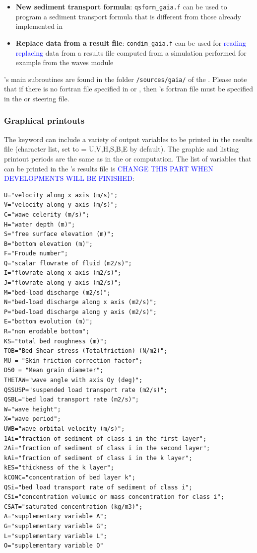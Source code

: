 {\begin{itemize}
\item \textbf{New sediment transport formula}: \texttt{qsform\_gaia.f} can be used to program a sediment transport formula that is different from those already implemented in \gaia{}

\item \textbf{Replace data from a result file}: \texttt{condim\_gaia.f} can be used for \textcolor{blue}{\sout{reading}} \textcolor{blue}{replacing} data from a results file computed from a simulation performed for example from the waves module \tomawac{}

\end{itemize}

\gaia{}'s main subroutines are found in the folder \texttt{/sources/gaia/} of the \telemacsystem{}. Please note that if there is no fortran file specified in  or , then \gaia's fortran file must be specified in the  or  steering file.

\pagebreak

\subsubsection{Graphical printouts}
The keyword  can include a variety of output variables to be printed in the results file (character list, set to {\ttfamily = U,V,H,S,B,E} by default). The graphic and listing printout periods are the same as in the  or  computation. The list of variables that can be printed in the \gaia{}'s results file is \textcolor{blue}{CHANGE THIS PART WHEN DEVELOPMENTS WILL BE FINISHED}:
\begin{lstlisting}[frame=trBL]
U="velocity along x axis (m/s)";
V="velocity along y axis (m/s)";
C="wawe celerity (m/s)";
H="water depth (m)";
S="free surface elevation (m)";
B="bottom elevation (m)";
F="Froude number";
Q="scalar flowrate of fluid (m2/s)";
I="flowrate along x axis (m2/s)";
J="flowrate along y axis (m2/s)";
M="bed-load discharge (m2/s)";
N="bed-load discharge along x axis (m2/s)";
P="bed-load discharge along y axis (m2/s)";
E="bottom evolution (m)";
R="non erodable bottom";
KS="total bed roughness (m)";
TOB="Bed Shear stress (Totalfriction) (N/m2)";
MU = "Skin friction correction factor";
D50 = "Mean grain diameter";
THETAW="wave angle with axis Oy (deg)";
QSSUSP="suspended load transport rate (m2/s)";
QSBL="bed load transport rate (m2/s)";
W="wave height";
X="wave period";
UWB="wave orbital velocity (m/s)";
1Ai="fraction of sediment of class i in the first layer";
2Ai="fraction of sediment of class i in the second layer";
kAi="fraction of sediment of class i in the k layer";
kES="thickness of the k layer";
kCONC="concentration of bed layer k";
QSi="bed load transport rate of sediment of class i";
CSi="concentration volumic or mass concentration for class i";
CSAT="saturated concentration (kg/m3)";
A="supplementary variable A";
G="supplementary variable G";
L="supplementary variable L";
O="supplementary variable O"
\end{lstlisting}

}

